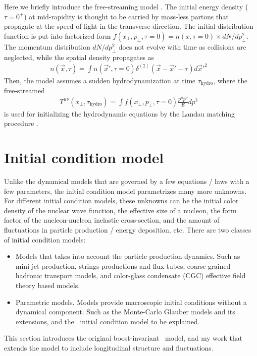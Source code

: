 Here we briefly introduce the free-streaming model \cite{Liu:2015nwa}.
The initial energy density ($\tau = 0^+$) at mid-rapidity is thought to be carried by mass-less partons that propagate at the speed of light in the transverse direction. 
The initial distribution function is put into factorized form $f(x_\perp, p_\perp, \tau=0) = n(x, \tau=0) \times dN/dp_\perp^2$.
The momentum distribution $dN/dp_\perp^2$ does not evolve with time as collisions are neglected, while the spatial density propagates as
\begin{eqnarray}
n(\vec{x}, \tau) = \int n(\vec{x}', \tau=0) \delta^{(2)}(\vec{x} - \vec{x}'- \tau) d\vec{x}'^2
\end{eqnarray}
Then, the model assumes a sudden hydrodynamization at time $\tau_{\textrm{hydro}}$, where the free-streamed
\begin{eqnarray}
T^{\mu\nu}(x_\perp, \tau_{\textrm{hydro}}) = \int f(x_\perp, p_\perp, \tau=0) \frac{p^\mu p^\nu}{E} dp^3
\end{eqnarray}
is used for initializing the hydrodynamic equations by the Landau matching procedure \cite{Liu:2015nwa}.

\section{Initial condition model}
Unlike the dynamical models that are governed by a few equations / laws with a few parameters, the initial condition model parametrizes many more unknowns.
For different initial condition models, these unknowns can be the initial color density of the nuclear wave function, the effective size of a nucleon, the form factor of the nucleon-nucleon inelastic cross-section, and the amount of fluctuations in particle production / energy deposition, etc.
There are two classes of initial condition models:
\begin{itemize}
\item Models that takes into account the particle production dynamics. Such as mini-jet production, strings productions and flux-tubes, coarse-grained hadronic transport models, and color-glass condensate (CGC) effective field theory based models.
\item Parametric models. Models provide macroscopic initial conditions without a dynamical component. Such as the Monte-Carlo Glauber models and its extensions, and the \trento\ initial condition model to be explained.
\end{itemize}
This section introduces the original boost-invariant \trento\ model, and my work that extends the model to include longitudinal structure and fluctuations.

